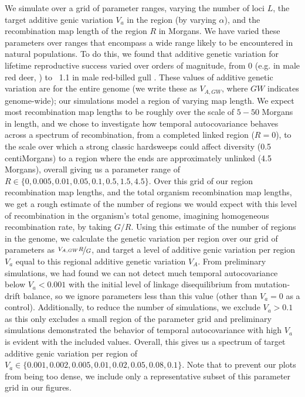 \documentclass[11pt]{article}
\begin{document}
We simulate over a grid of parameter ranges, varying the number of loci $L$,
the target additive genic variation $V_a$ in the region (by varying $\alpha$),
and the recombination map length of the region $R$ in Morgans. We have varied
these parameters over ranges that encompass a wide range likely to be
encountered in natural populations. To do this, we found that additive genetic
variation for lifetime reproductive success varied over orders of magnitude,
from 0 (e.g. in male red deer, \textcite{Kruuk2000-xt}) to ~1.1 in male
red-billed gull \parencite{Teplitsky2009-oj}. These values of additive genetic
variation are for the entire genome (we write these as $V_{A,GW}$, where $GW$
indicates genome-wide); our simulations model a region of varying map length.
We expect most recombination map lengths to be roughly over the scale of $5-50$
Morgans in length, and we chose to investigate how temporal autocovariance
behaves across a spectrum of recombination, from a completed linked region
($R=0$), to the scale over which a strong classic hardsweeps could affect
diversity (0.5 centiMorgans) to a region where the ends are approximately
unlinked (4.5 Morgans), overall giving us a parameter range of $R \in \{0,
0.005, 0.01, 0.05, 0.1, 0.5, 1.5, 4.5\}$.  Over this grid of our region
recombination map lengths, and the total organism recombination map lengths, we
get a rough estimate of the number of regions we would expect with this level
of recombination in the organism's total genome, imagining homogeneous
recombination rate, by taking $G/R$. Using this estimate of the number of
regions in the genome, we calculate the genetic variation per region over our
grid of parameters as $\nicefrac{V_{A,GW} R}{G}$, and target a level of
additive genic variation per region $V_a$ equal to this regional additive
genetic variation $V_A$. From preliminary simulations, we had found we can not
detect much temporal autocovariance below $V_a < 0.001$ with the initial level
of linkage disequilibrium from mutation-drift balance, so we ignore parameters
less than this value (other than $V_a=0$ as a control). Additionally, to reduce
the number of simulations, we exclude $V_a > 0.1$ as this only excludes a small
region of the parameter grid and preliminary simulations demonstrated the
behavior of temporal autocovariance with high $V_a$ is evident with the
included values. Overall, this gives us a spectrum of target additive genic
variation per region of $V_a \in \{0.001, 0.002, 0.005, 0.01, 0.02, 0.05, 0.08,
0.1\}$.  Note that to prevent our plots from being too dense, we include only a
representative subset of this parameter grid in our figures.
\end{document}
